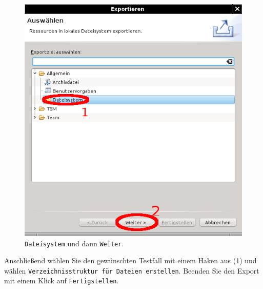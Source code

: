 \documentclass[11pt,a4paper,titlepage]{article}
\begin{document}
\begin{figure}[H]
 \centering
 \includegraphics{./assistent-exp1.png}
 \caption{\texttt{Dateisystem} und dann \texttt{Weiter}.}
 \label{abb:Assistent-exp1}
\end{figure}
\vspace{\baselineskip}
Anschließend wählen Sie den gewünschten Testfall mit einem Haken aus (1) und wählen \texttt{Verzeichnisstruktur für Dateien erstellen}. Beenden Sie den Export mit einem Klick auf \texttt{Fertigstellen}.
\end{document}
